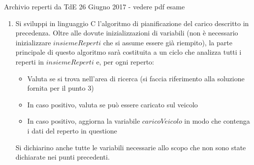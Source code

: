 \documentclass[aspectratio=169, handout]{beamer}
\begin{document}
\begin{frame}[allowframebreaks]{Archivio reperti da TdE 26 Giugno 2017 - vedere pdf esame}
\begin{enumerate}
        \item Si sviluppi in linguaggio C l’algoritmo di pianificazione del carico descritto in precedenza. Oltre alle
            dovute inizializzazioni di variabili (non è necessario inizializzare $insiemeReperti$ che si assume essere
            già riempito), la parte principale di questo algoritmo sarà costituita a un ciclo che analizza tutti i reperti in
            $insiemeReperti$ e, per ogni reperto:
            \begin{itemize}
                \item  Valuta se si trova nell'area di ricerca (si faccia riferimento alla soluzione fornita per il punto 3)
                \item  In caso positivo, valuta se può essere caricato sul veicolo
                \item  In caso positivo, aggiorna la variabile $caricoVeicolo$ in modo che contenga i dati del reperto in
                    questione
            \end{itemize}
            Si dichiarino anche tutte le variabili necessarie allo scopo che non sono state dichiarate nei punti precedenti.
    \end{enumerate}

\end{frame}
\end{document}
